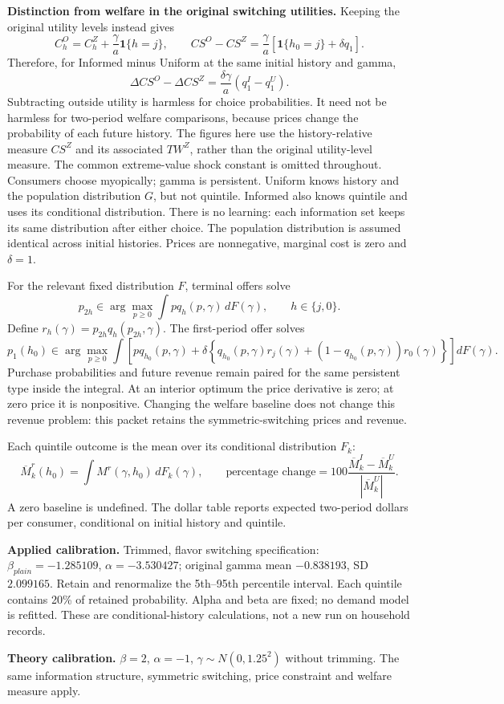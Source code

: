 \textbf{Distinction from welfare in the original switching utilities.}
Keeping the original utility levels instead gives
\[
C_h^O=C_h^Z+\frac{\gamma}{a}\mathbf1\{h=j\},\qquad
CS^O-CS^Z=\frac{\gamma}{a}\left[\mathbf1\{h_0=j\}+\delta q_1\right].
\]
Therefore, for Informed minus Uniform at the same initial history and gamma,
\[
\Delta CS^O-\Delta CS^Z=\frac{\delta\gamma}{a}(q_1^I-q_1^U).
\]
Subtracting outside utility is harmless for choice probabilities. It need not be
harmless for two-period welfare comparisons, because prices change the probability
of each future history. The figures here use the history-relative measure $CS^Z$
and its associated $TW^Z$, rather than the original utility-level measure.
The common extreme-value shock constant is omitted throughout.
\newpage
{}
\small
Consumers choose myopically; gamma is persistent. Uniform knows history and the
population distribution $G$, but not quintile. Informed also knows quintile and uses
its conditional distribution. There is no learning: each information set keeps its
same distribution after either choice. The population distribution is assumed identical
across initial histories. Prices are nonnegative, marginal cost is zero and $\delta=1$.

For the relevant fixed distribution $F$, terminal offers solve
\[
p_{2h}\in\arg\max_{p\geq0}\int p q_h(p,\gamma)\,dF(\gamma),\qquad h\in\{j,0\}.
\]
Define $r_h(\gamma)=p_{2h}q_h(p_{2h},\gamma)$. The first-period offer solves
\[
p_1(h_0)\in\arg\max_{p\geq0}\int\left[
 p q_{h_0}(p,\gamma)+\delta\left\{
 q_{h_0}(p,\gamma)r_j(\gamma)
 +(1-q_{h_0}(p,\gamma))r_0(\gamma)\right\}\right]dF(\gamma).
\]
Purchase probabilities and future revenue remain paired for the same persistent type
inside the integral. At an interior optimum the price derivative is zero; at zero price
it is nonpositive. Changing the welfare baseline does not change this revenue problem:
this packet retains the symmetric-switching prices and revenue.

Each quintile outcome is the mean over its conditional distribution $F_k$:
\[
\overline M_k^r(h_0)=\int M^r(\gamma,h_0)\,dF_k(\gamma),\qquad
\text{percentage change}=100\frac{\overline M_k^I-\overline M_k^U}{|\overline M_k^U|}.
\]
A zero baseline is undefined. The dollar table reports expected two-period dollars
per consumer, conditional on initial history and quintile.

\textbf{Applied calibration.}
Trimmed, flavor switching specification: $\beta_{plain}=-1.285109$, $\alpha=-3.530427$;
original gamma mean $-0.838193$, SD $2.099165$. Retain and renormalize the 5th--95th
percentile interval. Each quintile contains 20\% of retained probability. Alpha and beta
are fixed; no demand model is refitted. These are conditional-history calculations,
not a new run on household records.

\textbf{Theory calibration.}
$\beta=2$, $\alpha=-1$, $\gamma\sim N(0,1.25^2)$ without trimming.
The same information structure, symmetric switching, price constraint and welfare measure apply.

